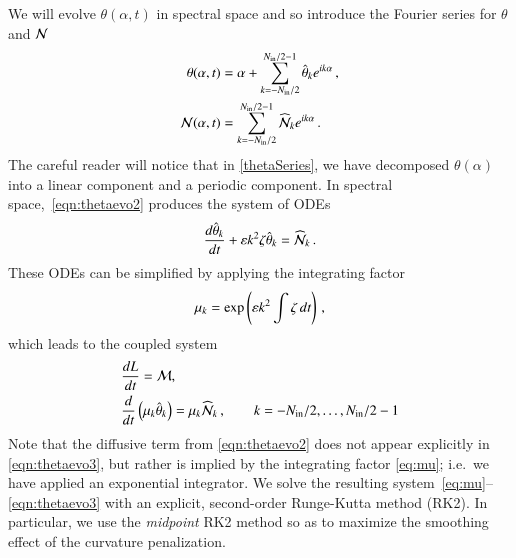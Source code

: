 \documentclass[preprint, 10pt]{elsarticle}
\begin{document}
We will evolve $\theta(\alpha,t)$ in spectral space and so introduce the Fourier series for $\theta$ and $\mathcal{N}$
\begin{align}
\label{thetaSeries}
 \theta(\alpha,t) &= \alpha + \FourierSum \thhat_k e^{ i k \alpha} \, , \\
 \NLterm(\alpha,t)  &= \FourierSum \widehat{\NLterm}_k e^{ i k \alpha} \, .
\end{align}
The careful reader will notice that in \eqref{thetaSeries}, we have decomposed $\theta(\alpha)$ into a linear component and a periodic component. In spectral space,~\eqref{eqn:thetaevo2} produces the system of ODEs
\begin{align*}
\tderiv{\thhat_k}{t} +  \eps k^2  \elfun \thhat_k = \widehat{\NLterm}_k \, .
\end{align*}
These ODEs can be simplified by applying the integrating factor
\begin{align}
\label{eq:mu}
\mu_k = \exp \left( \varepsilon k^2 \int \zeta \, dt \right) \, ,
\end{align}
which leads to the coupled system
\begin{align}
\label{eqn:Levo3}
& \tderiv{L}{t} = \Mterm, \\
\label{eqn:thetaevo3}
& \tderiv{}{t}\left( \mu_k \thhat_k \right) = \mu_k \widehat{\NLterm}_k \, ,
\qquad k = -N_\iin/2, \ldots, N_\iin/2 -1
\end{align}
Note that the diffusive term from \eqref{eqn:thetaevo2} does not appear explicitly in \eqref{eqn:thetaevo3}, but rather is implied by the integrating factor \eqref{eq:mu}; i.e.~we have applied an exponential integrator. We solve the resulting system~\eqref{eq:mu}--\eqref{eqn:thetaevo3} with an
explicit, second-order Runge-Kutta method (RK2). In particular, we use the {\em midpoint} RK2 method so as to maximize the smoothing effect of the curvature penalization.
\end{document}
